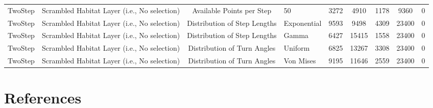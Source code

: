 \documentclass[10pt,a4paper]{article}
\begin{document}
\begin{table}
{\begin{tabular}[t]{lcclcclcc}
TwoStep & Scrambled Habitat Layer (i.e., No selection) & Available Points per Step & 50 & 3272 & 4910 & 1178 & 9360 & 0\\
TwoStep & Scrambled Habitat Layer (i.e., No selection) & Distribution of Step Lengths & Exponential & 9593 & 9498 & 4309 & 23400 & 0\\
TwoStep & Scrambled Habitat Layer (i.e., No selection) & Distribution of Step Lengths & Gamma & 6427 & 15415 & 1558 & 23400 & 0\\
TwoStep & Scrambled Habitat Layer (i.e., No selection) & Distribution of Turn Angles & Uniform & 6825 & 13267 & 3308 & 23400 & 0\\
TwoStep & Scrambled Habitat Layer (i.e., No selection) & Distribution of Turn Angles & Von Mises & 9195 & 11646 & 2559 & 23400 & 0\\

\end{tabular}}
\end{table}

\clearpage

\section*{References}\label{references}
\end{document}
